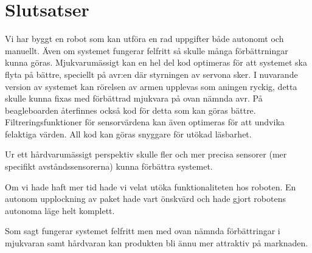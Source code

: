 
\section{Slutsatser}

Vi har byggt en robot som kan utföra en rad uppgifter både autonomt och manuellt. Även om systemet 
fungerar felfritt så skulle många förbättrningar kunna göras. 
Mjukvarumässigt kan en hel del kod optimeras för att systemet ska flyta på bättre, speciellt på avr:en 
där styrningen av servona sker. I nuvarande version av systemet kan rörelsen av armen upplevas som 
aningen ryckig, detta skulle kunna fixas med förbättrad mjukvara på ovan nämnda avr. På 
beagleboarden återfinnes också kod för detta som kan göras bättre. Filtreringsfunktioner för 
sensorvärdena kan även optimeras för att undvika felaktiga värden. All kod kan göras snyggare för 
utökad läsbarhet.

Ur ett hårdvarumässigt perspektiv skulle fler och mer precisa sensorer (mer specifikt 
avståndssensorerna) kunna förbättra systemet.

Om vi hade haft mer tid hade vi velat utöka funktionaliteten hos roboten. En autonom upplockning av 
paket hade vart önskvärd och hade gjort robotens autonoma läge helt komplett.

Som sagt fungerar systemet felfritt men med ovan nämnda förbättringar i mjukvaran samt hårdvaran 
kan produkten bli ännu mer attraktiv på marknaden.


